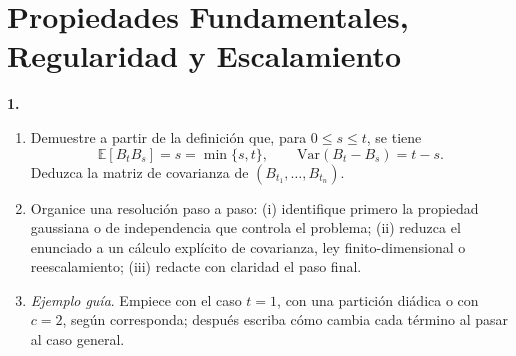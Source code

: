 \documentclass[11pt, letterpaper]{article}
\begin{document}
\section{Propiedades Fundamentales, Regularidad y Escalamiento}

\begin{ejercicio}
    \textbf{1.} 
    \begin{enumerate}
        \item Demuestre a partir de la definición que, para $0 \le s \le t$, se tiene
        \[ \mathbb{E}[B_t B_s] = s = \min\{s, t\}, \qquad \text{Var}(B_t - B_s) = t - s. \]
        Deduzca la matriz de covarianza de $(B_{t_1}, \dots, B_{t_n})$.
        \item Organice una resolución paso a paso: (i) identifique primero la propiedad gaussiana o de independencia que controla el problema; (ii) reduzca el enunciado a un cálculo explícito de covarianza, ley finito-dimensional o reescalamiento; (iii) redacte con claridad el paso final.
        \item \textit{Ejemplo guía}. Empiece con el caso $t=1$, con una partición diádica o con $c=2$, según corresponda; después escriba cómo cambia cada término al pasar al caso general.
    \end{enumerate}
\end{ejercicio}

\vspace{5mm}
\end{document}
